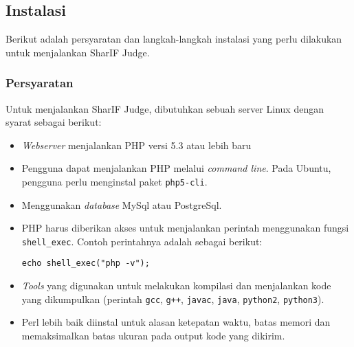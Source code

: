 \subsection{Instalasi}
\label{subsec:instalasi}
Berikut adalah persyaratan dan langkah-langkah instalasi yang perlu dilakukan untuk menjalankan SharIF Judge.

\subsubsection{Persyaratan}
\label{subsubsec:persyaratan}
Untuk menjalankan SharIF Judge, dibutuhkan sebuah server Linux dengan syarat sebagai berikut:
\begin{itemize}
	\item \textit{Webserver} menjalankan PHP versi 5.3 atau lebih baru
	\item Pengguna dapat menjalankan PHP melalui \textit{command line}. Pada Ubuntu, pengguna perlu menginstal paket \verb|php5-cli|.
	\item Menggunakan \textit{database} MySql atau PostgreSql.
	\item PHP harus diberikan akses untuk menjalankan perintah menggunakan fungsi \verb|shell_exec|. Contoh perintahnya adalah sebagai berikut:
	\begin{lstlisting}[basicstyle=\ttfamily, frame=single,
		columns=fullflexible, keepspaces=true, breaklines=true, label=ls:1]
		echo shell_exec("php -v");
	\end{lstlisting}
	\item \textit{Tools} yang digunakan untuk melakukan kompilasi dan menjalankan kode yang dikumpulkan (perintah \verb|gcc|, \verb|g++|, \verb|javac|, \verb|java|, \verb|python2|, \verb|python3|).
	\item Perl lebih baik diinstal untuk alasan ketepatan waktu, batas memori dan memaksimalkan batas ukuran pada output kode yang dikirim.
\end{itemize}

